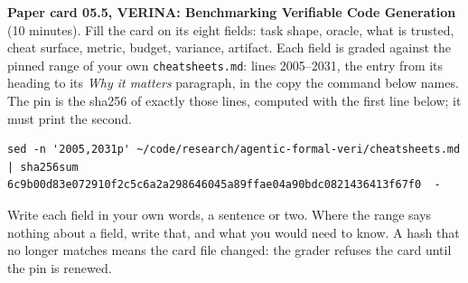 \documentclass[11pt]{article}
\begin{document}
\begin{problem}\label{prob:B2}
\textbf{Paper card 05.5, VERINA: Benchmarking Verifiable Code Generation}
(10 minutes). Fill the card on its eight fields: task shape, oracle, what is
trusted, cheat surface, metric, budget, variance, artifact. Each field is
graded against the pinned range of your own \texttt{cheatsheets.md}: lines
2005--2031, the entry from its heading to its \emph{Why it matters}
paragraph, in the copy the command below names. The pin is the sha256 of
exactly those lines, computed with the first line below; it must print the
second.
{\small
\begin{verbatim}
sed -n '2005,2031p' ~/code/research/agentic-formal-veri/cheatsheets.md | sha256sum
6c9b00d83e072910f2c5c6a2a298646045a89ffae04a90bdc0821436413f67f0  -
\end{verbatim}
}
Write each field in your own words, a sentence or two. Where the range says
nothing about a field, write that, and what you would need to know. A hash
that no longer matches means the card file changed: the grader refuses the
card until the pin is renewed.
\end{problem}
\end{document}
